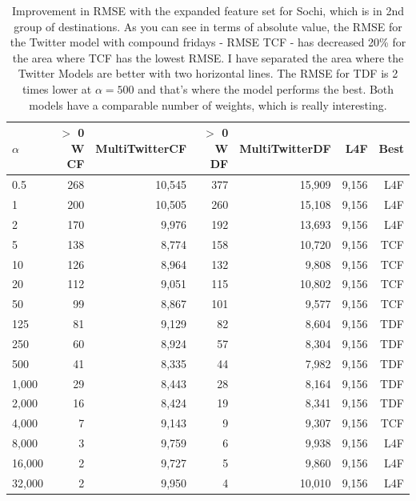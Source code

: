 \documentclass[minf,twoside,singlespacing,parskip,frontabs]{infthesis}
\begin{document}
\begin{table}[]
\begin{center}
\begin{tabular}{ l | r | r | r | r | r | r}
$\alpha$ & $>$ 0 W CF & MultiTwitterCF & $>$ 0 W DF & MultiTwitterDF & L4F & Best\\
\hline
0.5 & 268 & 10,545 & 377 & 15,909 & 9,156 & L4F\\
1 & 200 & 10,505 & 260 & 15,108 & 9,156 & L4F\\
2 & 170 & 9,976 & 192 & 13,693 & 9,156 & L4F\\
\hline
5 & 138 & 8,774 & 158 & 10,720 & 9,156 & TCF\\
10 & 126 & 8,964 & 132 & 9,808 & 9,156 & TCF\\
20 & 112 & 9,051 & 115 & 10,802 & 9,156 & TCF\\
50 & 99 & 8,867 & 101 & 9,577 & 9,156 & TCF\\
125 & 81 & 9,129 & 82 & 8,604 & 9,156 & TDF\\
250 & 60 & 8,924 & 57 & 8,304 & 9,156 & TDF\\
500 & 41 & 8,335 & 44 & 7,982 & 9,156 & TDF\\
1,000 & 29 & 8,443 & 28 & 8,164 & 9,156 & TDF\\
2,000 & 16 & 8,424 & 19 & 8,341 & 9,156 & TDF\\
4,000 & 7 & 9,143 & 9 & 9,307 & 9,156 & TCF\\
\hline
8,000 & 3 & 9,759 & 6 & 9,938 & 9,156 & L4F\\
16,000 & 2 & 9,727 & 5 & 9,860 & 9,156 & L4F\\
32,000 & 2 & 9,950 & 4 & 10,010 & 9,156 & L4F\\
\end{tabular}
\end{center}
\caption{Improvement in RMSE with the expanded feature set for Sochi, which is in 2nd group of destinations.  
As you can see in terms of absolute value, the RMSE for the Twitter model with compound fridays - RMSE TCF - has decreased 20\% for the area where TCF has the lowest RMSE. I have separated the area where the Twitter Models are better with two horizontal lines. The RMSE for TDF is 2 times lower at $\alpha=500$ and that's where the model performs the best. Both models have a comparable number of weights, which is really interesting.}
\label{table-sochi}
\end{table}
\end{document}
